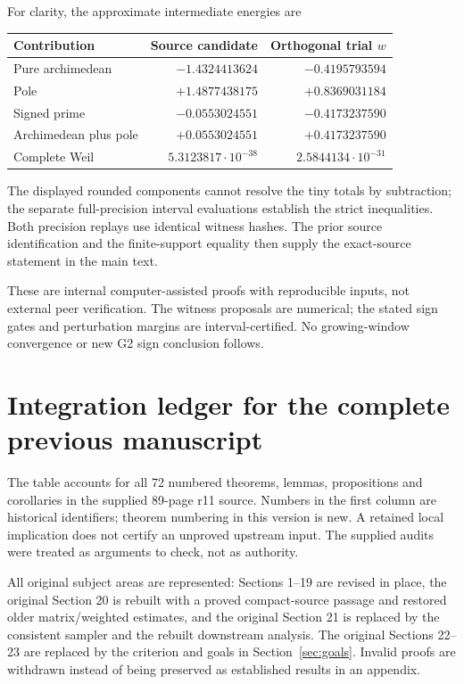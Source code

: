 \documentclass[11pt]{article}
\theoremstyle{remark}
\begin{document}
For clarity, the approximate intermediate energies are
\begin{center}
\begin{tabular}{@{}lrr@{}}
\toprule Contribution & Source candidate & Orthogonal trial $w$\\\midrule
Pure archimedean & $-1.4324413624$ & $-0.4195793594$\\
Pole & $+1.4877438175$ & $+0.8369031184$\\
Signed prime & $-0.0553024551$ & $-0.4173237590$\\
Archimedean plus pole & $+0.0553024551$ & $+0.4173237590$\\
Complete Weil & $5.3123817\cdot10^{-38}$ & $2.5844134\cdot10^{-31}$\\
\bottomrule
\end{tabular}
\end{center}
The displayed rounded components cannot resolve the tiny totals by
subtraction; the separate full-precision interval evaluations establish
the strict inequalities. Both precision replays use identical witness
hashes. The prior source identification and the finite-support equality
then supply the exact-source statement in the main text.

These are internal computer-assisted proofs with reproducible inputs,
not external peer verification. The witness proposals are numerical;
the stated sign gates and perturbation margins are interval-certified.
No growing-window convergence or new G2 sign conclusion follows.


\section{Integration ledger for the complete previous manuscript}\label{app:ledger}
The table accounts for all 72 numbered theorems, lemmas, propositions and
corollaries in the supplied 89-page r11 source. Numbers in the first column
are historical identifiers; theorem numbering in this version is new.
A retained local implication does not certify an unproved upstream input.
The supplied audits were treated as arguments to check, not as authority.

All original subject areas are represented: Sections 1--19 are revised in
place, the original Section 20 is rebuilt with a proved compact-source passage
and restored older matrix/weighted estimates, and the original Section 21
is replaced by the consistent sampler and the rebuilt downstream analysis.
The original Sections 22--23 are replaced by the criterion and goals in
Section~\ref{sec:goals}. Invalid proofs are withdrawn instead of being
preserved as established results in an appendix.
\end{document}
